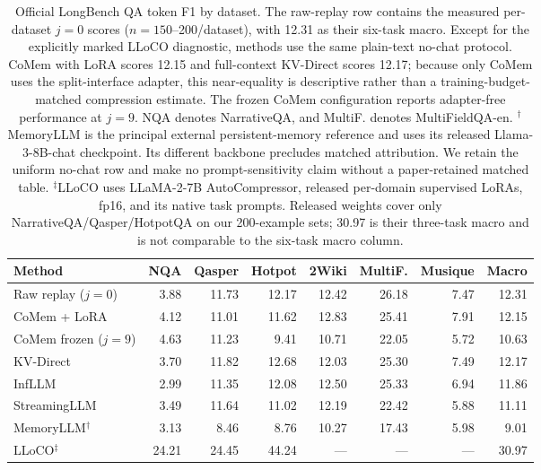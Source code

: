 \begin{table}[!htbp]
\centering
\small
\setlength{\tabcolsep}{3.5pt}
\begin{tabular}{@{}lrrrrrrr@{}}
\toprule
\textbf{Method}
& \textbf{NQA}
& \textbf{Qasper}
& \textbf{Hotpot}
& \textbf{2Wiki}
& \textbf{MultiF.}
& \textbf{Musique}
& \textbf{Macro} \\
\midrule
Raw replay ($j{=}0$)
& 3.88
& 11.73
& 12.17
& 12.42
& 26.18
& 7.47
& 12.31 \\

CoMem + LoRA
& 4.12
& 11.01
& 11.62
& 12.83
& 25.41
& 7.91
& 12.15 \\

CoMem frozen ($j{=}9$)
& 4.63
& 11.23
& 9.41
& 10.71
& 22.05
& 5.72
& 10.63 \\

KV-Direct
& 3.70
& 11.82
& 12.68
& 12.03
& 25.30
& 7.49
& 12.17 \\

InfLLM
& 2.99
& 11.35
& 12.08
& 12.50
& 25.33
& 6.94
& 11.86 \\

StreamingLLM
& 3.49
& 11.64
& 11.02
& 12.19
& 22.42
& 5.88
& 11.11 \\

MemoryLLM$^{\dagger}$
& 3.13
& 8.46
& 8.76
& 10.27
& 17.43
& 5.98
& 9.01 \\

LLoCO$^{\ddagger}$
& 24.21
& 24.45
& 44.24
& ---
& ---
& ---
& 30.97 \\
\bottomrule
\end{tabular}
\caption{Official LongBench QA token F1 by dataset. The raw-replay row contains
the measured per-dataset $j{=}0$ scores ($n{=}150$--200/dataset), with 12.31 as
their six-task macro. Except for the explicitly marked LLoCO diagnostic, methods
use the same plain-text no-chat protocol. CoMem with LoRA scores
12.15 and full-context KV-Direct scores 12.17; because only CoMem uses the
split-interface adapter, this near-equality is descriptive rather than a
training-budget-matched compression estimate. The frozen
CoMem configuration reports adapter-free performance at $j{=}9$.
NQA denotes NarrativeQA, and MultiF. denotes MultiFieldQA-en.
$^{\dagger}$MemoryLLM is the principal external persistent-memory reference and
uses its released Llama-3-8B-chat checkpoint. Its different backbone precludes
matched attribution. We retain the uniform no-chat row and make no
prompt-sensitivity claim without a paper-retained matched table.
$^{\ddagger}$LLoCO uses LLaMA-2-7B AutoCompressor, released per-domain supervised
LoRAs, fp16, and its native task prompts. Released weights cover only
NarrativeQA/Qasper/HotpotQA on our 200-example sets; 30.97 is their three-task
macro and is not comparable to the six-task macro column.}
\label{tab:longbench}
\end{table}
